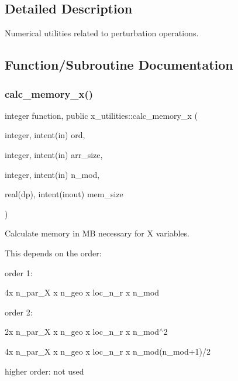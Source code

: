 \subsection{Detailed Description}
Numerical utilities related to perturbation operations. 

\subsection{Function/\+Subroutine Documentation}
\mbox{\label{namespacex__utilities_a4d18921da77463d069346f1c7322b451}} 
\subsubsection{\texorpdfstring{calc\+\_\+memory\+\_\+x()}{calc\_memory\_x()}}
{\footnotesize\ttfamily integer function, public x\+\_\+utilities\+::calc\+\_\+memory\+\_\+x (\begin{DoxyParamCaption}\item[{integer, intent(in)}]{ord,  }\item[{integer, intent(in)}]{arr\+\_\+size,  }\item[{integer, intent(in)}]{n\+\_\+mod,  }\item[{real(dp), intent(inout)}]{mem\+\_\+size }\end{DoxyParamCaption})}



Calculate memory in MB necessary for X variables. 

This depends on the order\+:
\begin{DoxyItemize}
\item order 1\+:
\begin{DoxyItemize}
\item {\ttfamily 4x n\+\_\+par\+\_\+X x n\+\_\+geo x loc\+\_\+n\+\_\+r x n\+\_\+mod}
\end{DoxyItemize}
\item order 2\+:
\begin{DoxyItemize}
\item {\ttfamily 2x n\+\_\+par\+\_\+X x n\+\_\+geo x loc\+\_\+n\+\_\+r x n\+\_\+mod$^\wedge$2}
\item {\ttfamily 4x n\+\_\+par\+\_\+X x n\+\_\+geo x loc\+\_\+n\+\_\+r x n\+\_\+mod(n\+\_\+mod+1)/2}
\end{DoxyItemize}
\item higher order\+: not used
\end{DoxyItemize}

